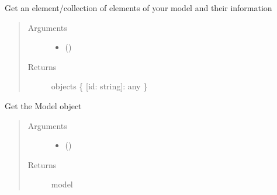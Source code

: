 \documentclass[a4paper,12pt,english]{sphinxmanual}
\begin{document}
\begin{fulllineitems}
\label{\detokenize{viewer/parameters:BIMDataViewer.getElementsInfo}}
Get an element/collection of elements of your model and their information
\begin{quote}\begin{description}
\item[{Arguments}] \leavevmode\begin{itemize}
\item {} 
 () \textendash{} 

\end{itemize}

\item[{Returns}] \leavevmode
objects \{ {[}id: string{]}: any \}

\end{description}\end{quote}

\end{fulllineitems}



\begin{fulllineitems}
\label{\detokenize{viewer/parameters:BIMDataViewer.getModel}}
Get the Model object
\begin{quote}\begin{description}
\item[{Arguments}] \leavevmode\begin{itemize}
\item {} 
 () \textendash{} 

\end{itemize}

\item[{Returns}] \leavevmode
model

\end{description}\end{quote}

\end{fulllineitems}
\end{document}
